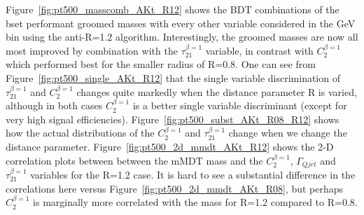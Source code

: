 Figure~\ref{fig:pt500_masscomb_AKt_R12} shows the BDT combinations of
the bset performant groomed masses with every other
variable considered in the  GeV bin using the anti-\kT R=1.2
algorithm. Interestingly, the groomed masses are now all most improved by combination
with the $\tau_{21}^{\beta=1}$ variable, in contrast with
$C_{2}^{\beta=1}$ which performed best for the smaller radius of
R=0.8. One can see from Figure~\ref{fig:pt500_single_AKt_R12} that the
single variable discrimination of $\tau_{21}^{\beta=1}$ and
$C_{2}^{\beta=1}$ changes quite markedly when the distance parameter R
is varied, although in both cases $C_{2}^{\beta=1}$ is a better single
variable discriminant (except for very high signal
efficiencies). Figure~\ref{fig:pt500_subst_AKt_R08_R12} shows how the
actual distributions of the $C_{2}^{\beta=1}$ and $\tau_{21}^{\beta=1}$
change when we change the distance parameter. Figure~\ref{fig:pt500_2d_mmdt_AKt_R12} shows the 2-D
correlation plots between between the mMDT mass and the $C_{2}^{\beta=1}$,
$\Gamma_{Qjet}$ and $\tau_{21}^{\beta=1}$ variables for the R=1.2
case. It is hard to see a substantial difference in the correlations
here versus Figure~\ref{fig:pt500_2d_mmdt_AKt_R08}, but perhaps
$C_{2}^{\beta=1}$ is marginally more correlated with the mass for
R=1.2 compared to R=0.8.

